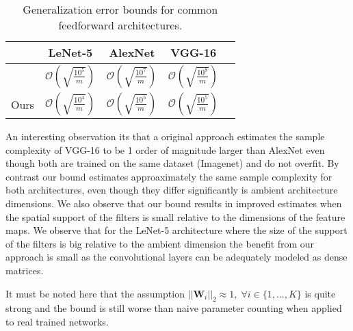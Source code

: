 \documentclass{article} %
\newcommand\T{\rule{0pt}{2.6ex}}       %
\theoremstyle{definition}
\begin{document}
\begin{table}[h!]
\caption{Generalization error bounds for common feedforward architectures.} \label{tab:title2} 
\label{sample-table}
\vskip 0.15in
\begin{center}
\begin{small}
\begin{sc}
\begin{tabular}{ lcccc  }
  \toprule
   & LeNet-5 & AlexNet & VGG-16 \\ 
  \midrule
  \citet{neyshabur2017pac} & $\mathcal{O}(\sqrt{\frac{10^5 }{ m }})$ & $\mathcal{O}(\sqrt{\frac{10^{7} }{ m }})$ & $\mathcal{O}(\sqrt{\frac{10^{8} }{ m }})$ \T\\		
  Ours  & $\mathcal{O}(\sqrt{\frac{10^4 }{ m }})$ & $\mathcal{O}(\sqrt{\frac{10^5 }{ m }})$ & $\mathcal{O}(\sqrt{\frac{10^5 }{ m }})$  \\
  \bottomrule
\end{tabular}
\end{sc}
\end{small}
\end{center}
\vskip -0.1in
\end{table}

An interesting observation its that a original approach estimates the sample complexity of VGG-16 to be 1 order of magnitude larger than AlexNet even though both are trained on the same dataset (Imagenet) and do not overfit. By contrast our bound estimates approaximately the same sample complexity for both architectures, even though they differ significantly is ambient architecture dimensions. We also observe that our bound results in improved estimates when the spatial support of the filters is small relative to the dimensions of the feature maps. We observe that for the LeNet-5 architecture where the size of the support of the filters is big relative to the ambient dimension the benefit from our approach is small as the convolutional layers can be adequately modeled as dense matrices. 

It must be noted here that the assumption $||\boldsymbol{W}_i||_2 \approx 1 , \; \forall i \in \{1,...,K\}$ is quite strong and the bound is still worse than naive parameter counting when applied to real trained networks.
\end{document}
